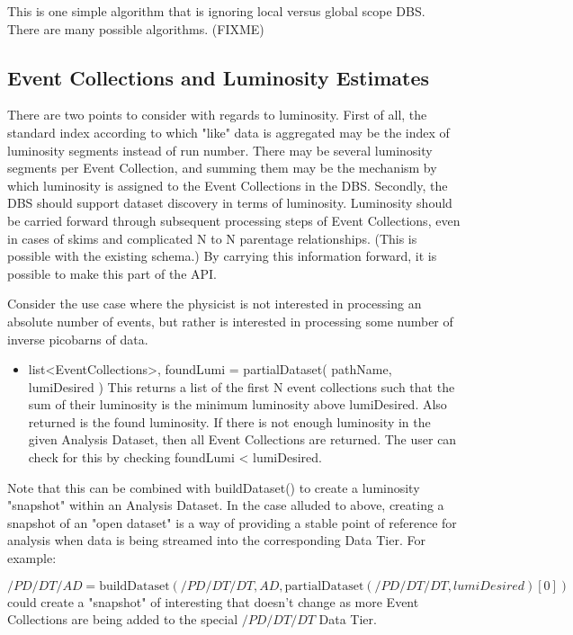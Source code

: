 \documentclass{cmspaper}
\begin{document}
This is one simple algorithm that is ignoring local versus global scope DBS.  
There are many possible algorithms.  (FIXME)


\subsection{ Event Collections and Luminosity Estimates}

  There are two points to consider with regards to luminosity.  First of
all, the standard index according to which "like" data is aggregated may
be the index of luminosity segments instead of run number.  There may be
several luminosity segments per Event Collection, and summing them may be
the mechanism by which luminosity is assigned to the Event Collections
in the DBS.   Secondly, the DBS should support dataset discovery in
terms of luminosity.  Luminosity should be carried forward through
subsequent processing steps of Event Collections, even in cases of
skims and complicated N to N parentage relationships.  (This is possible
with the existing schema.)  By carrying this information forward, it is
possible to make this part of the API.

  Consider the use case where the physicist is not interested in processing 
an absolute number of events, but rather is interested in processing some
number of inverse picobarns of data.

\begin{itemize}
\item  list<EventCollections>, foundLumi = partialDataset( pathName, lumiDesired )
       This returns a list of the first N event collections such that the sum 
       of their luminosity is the minimum luminosity above lumiDesired.  Also 
       returned is the found luminosity.  If there is not enough luminosity in 
       the given Analysis Dataset, then all Event Collections are returned.  
       The user can check for this by checking foundLumi < lumiDesired.

\end{itemize}

Note that this can be combined with buildDataset() to create a luminosity
"snapshot" within an Analysis Dataset.  In the case alluded to above,
creating a snapshot of an "open dataset" is a way of providing a stable
point of reference for analysis when data is being streamed into the
corresponding Data Tier. For example:

\begin{equation}
   /PD/DT/AD = \mbox{buildDataset} ( /PD/DT/DT, AD, \mbox{partialDataset} ( /PD/DT/DT, lumiDesired )[0] )
\end{equation}
could create a "snapshot" of interesting that doesn't change as more Event 
Collections are being added to the special $/PD/DT/DT$ Data Tier.
\end{document}
